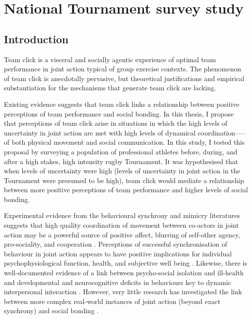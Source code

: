 
\begin{savequote}[8cm]

  \qauthor{}
\end{savequote}


\chapter{\label{chap:tournamentSurvey}National Tournament survey study}
                                            \begin{CJK}{UTF8}{gbsn}

\minitoc

\section{Introduction\label{sect:introSurvey}}
Team click is a visceral and socially agentic experience of optimal team performance in joint action typical of group exercise contexts.
The phenomenon of team click is anecdotally pervasive, but theoretical justifications and empirical substantiation for the mechanisms that generate team click are lacking.

Existing evidence suggests that team click links a relationship between positive perceptions of team performance and social bonding.  In this thesis, I propose that perceptions of team click arise in situations in which the high levels of uncertainty in joint action are met with high levels of dynamical coordination—--of both physical movement and social communication.  In this study, I tested this proposal by surveying a population of professional athletes before, during, and after a high stakes, high intensity rugby Tournament.  It was hypothesised that when levels of uncertainty were high (levels of uncertainty in joint action in the Tournament were presumed to be high), team click would mediate a relationship between more positive perceptions of team performance and higher levels of social bonding.

Experimental evidence from the behavioural synchrony and mimicry literatures suggests that high quality coordination of movement between co-actors in joint action may be a powerful source of positive affect, blurring of self-other agency, pro-sociality, and cooperation \citep{Mogan2017}.  Perceptions of successful synchronisation of behaviour in joint action appears to have positive implications for individual psychophysiological function, health, and subjective well being \citep{Wheatley2012}.  Likewise, there is well-documented evidence of a link between psycho-social isolation and ill-health and developmental and neurocognitive deficits in behaviours key to dynamic interpersonal interaction \citep[e.g.][]{Blakemore2005,Baron-Cohen1991}.  However, very little research has investigated the link between more complex real-world instances of joint action (beyond exact synchrony) and social bonding \citep[but see, for example]{Marsh2009}.


\end{CJK}
